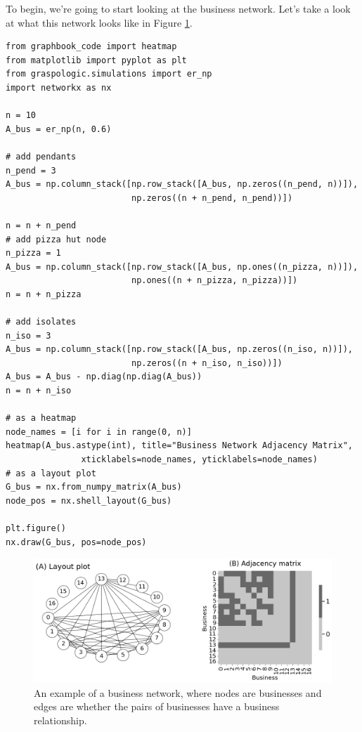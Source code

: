 To begin, we're going to start looking at the business network. Let's take a look at what this network looks like in Figure \ref{fig:ch4:businessex}.

\begin{lstlisting}[style=python]
from graphbook_code import heatmap
from matplotlib import pyplot as plt
from graspologic.simulations import er_np
import networkx as nx

n = 10
A_bus = er_np(n, 0.6)

# add pendants
n_pend = 3
A_bus = np.column_stack([np.row_stack([A_bus, np.zeros((n_pend, n))]), 
                         np.zeros((n + n_pend, n_pend))])

n = n + n_pend
# add pizza hut node
n_pizza = 1
A_bus = np.column_stack([np.row_stack([A_bus, np.ones((n_pizza, n))]), 
                         np.ones((n + n_pizza, n_pizza))])
n = n + n_pizza

# add isolates
n_iso = 3
A_bus = np.column_stack([np.row_stack([A_bus, np.zeros((n_iso, n))]), 
                         np.zeros((n + n_iso, n_iso))])
A_bus = A_bus - np.diag(np.diag(A_bus))
n = n + n_iso

# as a heatmap
node_names = [i for i in range(0, n)]
heatmap(A_bus.astype(int), title="Business Network Adjacency Matrix", 
               xticklabels=node_names, yticklabels=node_names)
# as a layout plot
G_bus = nx.from_numpy_matrix(A_bus)
node_pos = nx.shell_layout(G_bus)

plt.figure()
nx.draw(G_bus, pos=node_pos)
\end{lstlisting}

\begin{figure}[h]
    \centering
    \includegraphics[width=\linewidth]{representations/ch4/Images/businessex.png}
    \caption[Business network example]{An example of a business network, where nodes are businesses and edges are whether the pairs of businesses have a business relationship.}
    \label{fig:ch4:businessex}
\end{figure}

